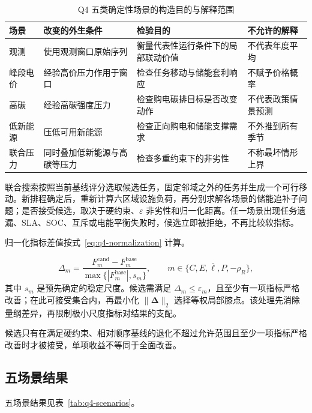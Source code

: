 \begin{table}[H]
  \centering
  \caption{Q4 五类确定性场景的构造目的与解释范围}
  \label{tab:q4-scenario-definition}
  \small
  \begin{tabularx}{\textwidth}{p{}p{}p{}X}
    \toprule
    场景 & 改变的外生条件 & 检验目的 & 不允许的解释 \\
    \midrule
    观测 & 使用观测窗口原始序列 & 衡量代表性运行条件下的局部联动价值 & 不代表年度平均 \\
    峰段电价 & 经验高价压力作用于窗口 & 检查任务移动与储能套利响应 & 不赋予价格概率 \\
    高碳 & 经验高碳强度压力 & 检查购电碳排目标是否改变动作 & 不代表政策情景预测 \\
    低新能源 & 压低可用新能源 & 检查正向购电和储能支撑需求 & 不外推到所有季节 \\
    联合压力 & 同时叠加低新能源与高碳等压力 & 检查多重约束下的非劣性 & 不称最坏情形上界 \\
    \bottomrule
  \end{tabularx}
\end{table}

联合搜索按照当前基线评分选取候选任务，固定邻域之外的任务并生成一个可行移动。新排程确定后，重新计算六区域设施负荷，再分别求解各场景的储能追补子问题；是否接受候选，取决于硬约束、$\varepsilon$ 非劣性和归一化距离。任一场景出现任务遗漏、SLA、SOC、互斥或电能平衡失败时，候选立即被拒绝，不再比较软指标。

归一化指标差值按式~\eqref{eq:q4-normalization} 计算。

\begin{equation}
  \Delta_m=\frac{F_m^{\mathrm{cand}}-F_m^{\mathrm{base}}}
  {\max\{|F_m^{\mathrm{base}}|,s_m\}},\qquad m\in\{C,E,\bar\ell,P,-\rho_R\},
  \label{eq:q4-normalization}
\end{equation}
其中 $s_m$ 是预先确定的稳定尺度。候选需满足 $\Delta_m\le\varepsilon_m$，且至少有一项指标严格改善；在此可接受集合内，再最小化 $\|\boldsymbol\Delta\|_2$ 选择等权局部膝点。该处理先消除量纲差异，再限制极小尺度指标对结果的支配。

候选只有在满足硬约束、相对顺序基线的退化不超过允许范围且至少一项指标严格改善时才被接受，单项收益不等同于全面改善。

\subsection{五场景结果}

五场景结果见表~\ref{tab:q4-scenarios}。

